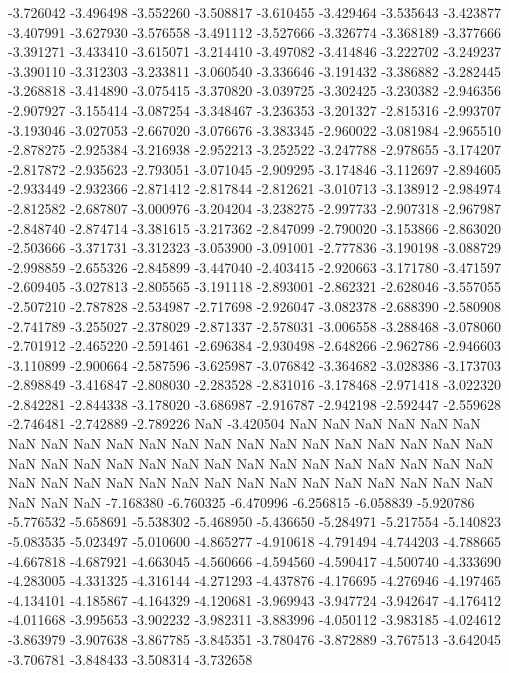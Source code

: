 -3.726042
-3.496498
-3.552260
-3.508817
-3.610455
-3.429464
-3.535643
-3.423877
-3.407991
-3.627930
-3.576558
-3.491112
-3.527666
-3.326774
-3.368189
-3.377666
-3.391271
-3.433410
-3.615071
-3.214410
-3.497082
-3.414846
-3.222702
-3.249237
-3.390110
-3.312303
-3.233811
-3.060540
-3.336646
-3.191432
-3.386882
-3.282445
-3.268818
-3.414890
-3.075415
-3.370820
-3.039725
-3.302425
-3.230382
-2.946356
-2.907927
-3.155414
-3.087254
-3.348467
-3.236353
-3.201327
-2.815316
-2.993707
-3.193046
-3.027053
-2.667020
-3.076676
-3.383345
-2.960022
-3.081984
-2.965510
-2.878275
-2.925384
-3.216938
-2.952213
-3.252522
-3.247788
-2.978655
-3.174207
-2.817872
-2.935623
-2.793051
-3.071045
-2.909295
-3.174846
-3.112697
-2.894605
-2.933449
-2.932366
-2.871412
-2.817844
-2.812621
-3.010713
-3.138912
-2.984974
-2.812582
-2.687807
-3.000976
-3.204204
-3.238275
-2.997733
-2.907318
-2.967987
-2.848740
-2.874714
-3.381615
-3.217362
-2.847099
-2.790020
-3.153866
-2.863020
-2.503666
-3.371731
-3.312323
-3.053900
-3.091001
-2.777836
-3.190198
-3.088729
-2.998859
-2.655326
-2.845899
-3.447040
-2.403415
-2.920663
-3.171780
-3.471597
-2.609405
-3.027813
-2.805565
-3.191118
-2.893001
-2.862321
-2.628046
-3.557055
-2.507210
-2.787828
-2.534987
-2.717698
-2.926047
-3.082378
-2.688390
-2.580908
-2.741789
-3.255027
-2.378029
-2.871337
-2.578031
-3.006558
-3.288468
-3.078060
-2.701912
-2.465220
-2.591461
-2.696384
-2.930498
-2.648266
-2.962786
-2.946603
-3.110899
-2.900664
-2.587596
-3.625987
-3.076842
-3.364682
-3.028386
-3.173703
-2.898849
-3.416847
-2.808030
-2.283528
-2.831016
-3.178468
-2.971418
-3.022320
-2.842281
-2.844338
-3.178020
-3.686987
-2.916787
-2.942198
-2.592447
-2.559628
-2.746481
-2.742889
-2.789226
NaN
-3.420504
NaN
NaN
NaN
NaN
NaN
NaN
NaN
NaN
NaN
NaN
NaN
NaN
NaN
NaN
NaN
NaN
NaN
NaN
NaN
NaN
NaN
NaN
NaN
NaN
NaN
NaN
NaN
NaN
NaN
NaN
NaN
NaN
NaN
NaN
NaN
NaN
NaN
NaN
NaN
NaN
NaN
NaN
NaN
NaN
NaN
NaN
NaN
NaN
NaN
NaN
NaN
NaN
NaN
NaN
-7.168380
-6.760325
-6.470996
-6.256815
-6.058839
-5.920786
-5.776532
-5.658691
-5.538302
-5.468950
-5.436650
-5.284971
-5.217554
-5.140823
-5.083535
-5.023497
-5.010600
-4.865277
-4.910618
-4.791494
-4.744203
-4.788665
-4.667818
-4.687921
-4.663045
-4.560666
-4.594560
-4.590417
-4.500740
-4.333690
-4.283005
-4.331325
-4.316144
-4.271293
-4.437876
-4.176695
-4.276946
-4.197465
-4.134101
-4.185867
-4.164329
-4.120681
-3.969943
-3.947724
-3.942647
-4.176412
-4.011668
-3.995653
-3.902232
-3.982311
-3.883996
-4.050112
-3.983185
-4.024612
-3.863979
-3.907638
-3.867785
-3.845351
-3.780476
-3.872889
-3.767513
-3.642045
-3.706781
-3.848433
-3.508314
-3.732658
